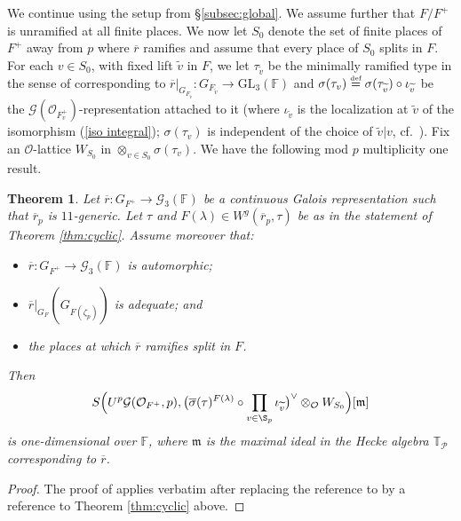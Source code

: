 \documentclass[oneside,a4paper,english, 11pt]{amsart}
\theoremstyle{plain}
\newtheorem{thm}{Theorem}[subsection]
\theoremstyle{plain}
\theoremstyle{plain}
\theoremstyle{plain}
\theoremstyle{plain}
\theoremstyle{plain}
\theoremstyle{definition}
\theoremstyle{definition}
\theoremstyle{definition}
\theoremstyle{remark}
\numberwithin{equation}{section}
\newcommand{\F}{\mathbb{F}}
\newcommand{\cG}{\mathcal{G}}
\newcommand{\cO}{\mathcal{O}}
\newcommand{\cP}{\mathcal{P}}
\newcommand{\GL}{\mathrm{GL}}
\newcommand{\tld}[1]{\widetilde{#1}}
\newcommand{\rbar}{\overline{r}}
\newcommand{\defeq}{\stackrel{\textrm{\tiny{def}}}{=}}
\newcommand{\ovl}[1]{\overline{#1}}
\newcommand{\ra}{\rightarrow}
\begin{document}
We continue using the setup from \S \ref{subsec:global}.
We assume further that $F/F^+$ is unramified at all finite places.
%
We now let $S_0$ denote the set of finite places of $F^+$ away from $p$ where $\rbar$ ramifies and assume that every place of $S_0$ splits in $F$.
For each $v\in S_0$, with fixed lift $\tld{v}$ in $F$, we let $\tau_{\tld{v}}$ be the minimally ramified type in the sense of \cite[Definition 2.4.14]{CHT} corresponding to $\rbar|_{G_{F_{\tld{v}}}}:G_{F_{\tld{v}}}\ra\GL_3(\F)$ and $\sigma(\tau_v)\defeq \sigma(\tau_{\tld{v}})\circ\iota_{\tld{v}}$ be the $\cG(\cO_{F^+_{v}})$-representation attached to it (where $\iota_{\tld{v}}$ is the localization at ${\tld{v}}$ of the isomorphism (\ref{iso integral}); $\sigma(\tau_v)$ is independent of the choice of $\tld{v}|v$, cf.~\cite[\S 5.3]{LLLM2}).
Fix an $\cO$-lattice $W_{S_0}$ in ${\otimes}_{v\in S_0}\sigma(\tau_v)$.
We have the following mod $p$ multiplicity one result.
\begin{thm}\label{thm:modpmultone}
Let $\rbar: G_{F^{+}}\ra\cG_3(\F)$ be a continuous Galois representation such that $\rbar_p$ is $11$-generic.  Let $\tau$ and $F(\lambda)\in W^g(\rbar_p,\tau)$ be as in the statement of Theorem \ref{thm:cyclic}.
Assume moreover that:
\begin{itemize}
\item $\rbar: G_{F^{+}}\ra\cG_3(\F)$ is automorphic;
\item $\rbar|_{G_F}(G_{F(\zeta_p)})$ is adequate; and
%
\item the places at which $\rbar$ ramifies split in $F$.
\end{itemize}
Then 
\[
S\Big(U^p\cG(\cO_{F^+},p),\big(\ovl{\sigma}(\tau)^{F(\lambda)} \circ \prod_{v\in \S_p} \iota_{\tld{v}}\big)^\vee \otimes_{\cO}W_{S_0}\Big)[\mathfrak{m}]
\]
is one-dimensional over $\F$, where $\mathfrak{m}$ is the maximal ideal in the Hecke algebra $\mathbb{T}_{\cP}$ corresponding to $\rbar$.
\end{thm}
\begin{proof}
The proof of \cite[Theorem 5.3.4]{LLLM2} applies verbatim after replacing the reference to \cite[Theorem 5.2.1]{LLLM2} by a reference to Theorem \ref{thm:cyclic} above.
\end{proof}
\end{document}
